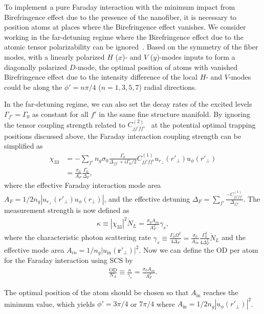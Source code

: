 \documentclass[pra,twocolumn,floatfix,superscriptaddress]{revtex4-1} %
\def\br{\mathbf{r}}
\begin{document}
To implement a pure Faraday interaction with the minimum impact from Birefringence effect due to the presence of the nanofiber, it is necessary to position atoms at places where the Birefringence effect vanishes. 
We consider working in the far-detuning regime where the Birefringence effect due to the atomic tensor polarizability can be ignored~\cite{Deutsch2010a}. 
Based on the symmetry of the fiber modes, with a linearly polarized $H$ ($x$)- and $V$ ($ y $)-modes inputs to form a diagonally polarized $ D $-mode, the optimal position of atoms with vanished Birefringence effect due to the intensity difference of the local $ H $- and $ V $-modes could be along the $ \phi'=n\pi/4 $ ($ n=1,3,5,7 $) radial directions. 

In the far-detuning regime, we can also set the decay rates of the excited levels $ \Gamma_{f'}= \Gamma_0$ as constant for all $ f' $ in the same fine structure manifold.
By ignoring the tensor coupling strength related to $ C_{jj'ff'}^{(2)} $~\cite{Deutsch2010a} at the potential optimal trapping positions discussed above, the Faraday interaction coupling strength can be simplified as
\begin{align}
\chi_{33} &= -\sum_{f'}n_g\sigma_0\frac{\Gamma_0}{\Delta_{ff'}+i\Gamma_0/2}C_{jj'ff'}^{(1)}u_{r\!_\perp}(r'\!_\perp)u_\phi(r'\!_\perp)\\
&=\frac{\sigma_0}{A_F}\frac{\Gamma_0}{\Delta_F},
\end{align}
where the effective Faraday interaction mode area $ A_F=1/2n_g|u_{r\!_\perp}(r'\!_\perp)u_\phi(r\!_\perp)| $, and the effective detuning $ \Delta_F=\sum_{f'}\frac{-C_{jj'ff'}^{(1)}}{\Delta_{ff'}} $.
The measurement strength is now defined as
\begin{align}
\kappa\equiv|\chi_{33}|^2\dot{N}_L=\frac{\sigma_0A_{in}}{A_F^2}\gamma_s,
\end{align}
where the characteristic photon scattering rate $ \gamma_s\equiv \frac{\Gamma_0\Omega^2}{4\Delta_F}=\frac{\sigma_0}{A_{in}}\frac{\Gamma_0^2}{4\Delta_F^2}\dot{N}_L $ and the effective mode area $ A_{in}=1/n_g|u_{\mathrm{in}}(\br'\!_\perp)|^2 $.
Now we can define the OD per atom for the Faraday interaction using SCS by
\begin{align}
\frac{\mathrm{OD}}{N_A} \equiv \frac{\kappa}{\gamma_s}=\frac{\sigma_0A_{in}}{A_F^2}.
\end{align}

The optimal position of the atom should be chosen so that $ A_{\mathrm{in}} $ reaches the minimum value, which yields $ \phi'=3\pi/4 $ or $ 7\pi/4 $ where $ A_{\mathrm{in}}=1/2n_g|u_\phi(r'\!_\perp)|^2 $.
\end{document}
